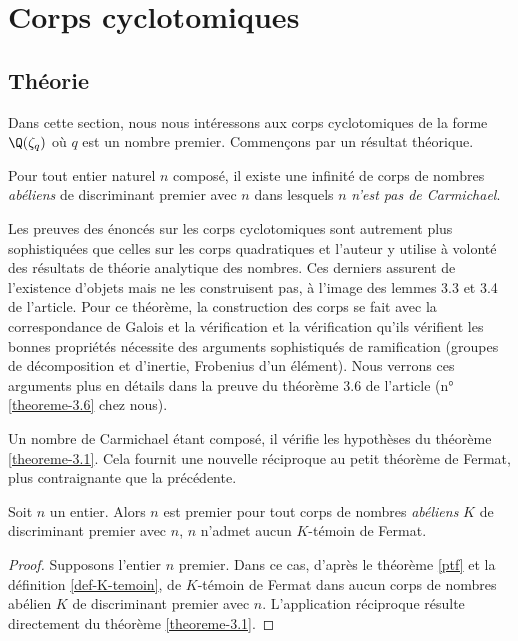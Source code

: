 \section{Corps cyclotomiques}

\subsection{Théorie}

Dans cette section, nous nous intéressons aux corps cyclotomiques de la forme $\Q(\zeta_q)$ où $q$ est un nombre premier. Commençons par un résultat théorique.

\begin{theoreme}\label{theoreme-3.1}
	Pour tout entier naturel $n$ composé, il existe une infinité de corps de nombres \emph{abéliens} de discriminant premier avec $n$ dans lesquels $n$ \emph{n'est pas de Carmichael}.
\end{theoreme}

\begin{MotSurPreuve}
	Les preuves des énoncés sur les corps cyclotomiques sont autrement plus sophistiquées que celles sur les corps quadratiques et l'auteur y utilise à volonté des résultats de théorie analytique des nombres. Ces derniers assurent de l'existence d'objets mais ne les construisent pas, à l'image des lemmes 3.3 et 3.4 de l'article. Pour ce théorème, la construction des corps se fait avec la correspondance de Galois et la vérification et la vérification qu'ils vérifient les bonnes propriétés nécessite des arguments sophistiqués de ramification (groupes de décomposition et d'inertie, Frobenius d'un élément). Nous verrons ces arguments plus en détails dans la preuve du théorème 3.6 de l'article (n°\ref{theoreme-3.6} chez nous). \\
\end{MotSurPreuve}

Un nombre de Carmichael étant composé, il vérifie les hypothèses du théorème \ref{theoreme-3.1}. Cela fournit une nouvelle réciproque au petit théorème de Fermat, plus contraignante que la précédente.

\begin{theoreme}
	Soit $n$ un entier. Alors $n$ est premier \ssi pour tout corps de nombres \emph{abéliens} $K$ de discriminant premier avec $n$, $n$ n'admet aucun $K$-témoin de Fermat.
\end{theoreme}

\begin{proof}
	Supposons l'entier $n$ premier. Dans ce cas, d'après le théorème \ref{ptf} et la définition \ref{def-K-temoin}, de $K$-témoin de Fermat dans aucun corps de nombres abélien $K$ de discriminant premier avec $n$. L'application réciproque résulte directement du théorème \ref{theoreme-3.1}.
\end{proof}

